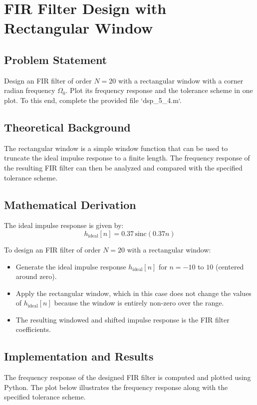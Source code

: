 \item[(e)]
\section{FIR Filter Design with Rectangular Window}

\subsection*{Problem Statement}
Design an FIR filter of order \( N = 20 \) with a rectangular window with a corner radian frequency \( \Omega_0 \). Plot its frequency response and the tolerance scheme in one plot. To this end, complete the provided file `dsp_5_4.m`.

\subsection*{Theoretical Background}
The rectangular window is a simple window function that can be used to truncate the ideal impulse response to a finite length. The frequency response of the resulting FIR filter can then be analyzed and compared with the specified tolerance scheme.

\subsection*{Mathematical Derivation}
The ideal impulse response is given by:
\[ h_{\text{ideal}}[n] = 0.37 \, \text{sinc}(0.37n) \]

To design an FIR filter of order \( N = 20 \) with a rectangular window:
\begin{itemize}
    \item Generate the ideal impulse response \( h_{\text{ideal}}[n] \) for \( n = -10 \) to \( 10 \) (centered around zero).
    \item Apply the rectangular window, which in this case does not change the values of \( h_{\text{ideal}}[n] \) because the window is entirely non-zero over the range.
    \item The resulting windowed and shifted impulse response is the FIR filter coefficients.
\end{itemize}

\subsection*{Implementation and Results}
The frequency response of the designed FIR filter is computed and plotted using Python. The plot below illustrates the frequency response along with the specified tolerance scheme.

